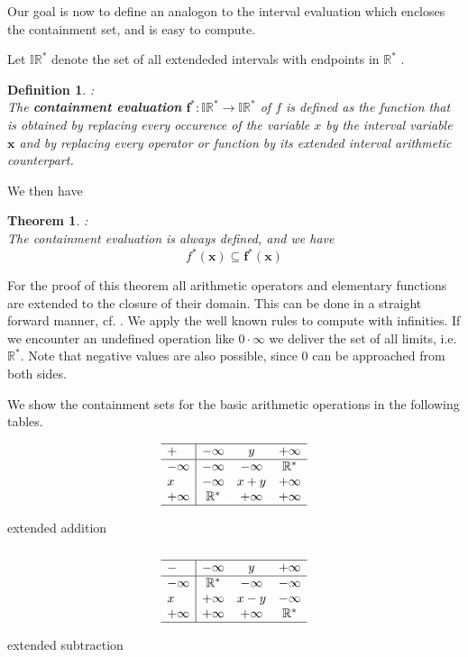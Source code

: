 \documentclass{report}
\newcommand{\Rs}{\mathbb{R}^*}
\newcommand{\IRs}{\mathbb{IR}^*}
\newcommand{\xx}{\mathbf{x}}
\newcommand{\ffs}{\mathbf{f}^*}
\newtheorem{defin}{Definition}
\newtheorem{theorem}{Theorem}
\begin{document}
Our goal is now to define an analogon to the interval evaluation which encloses
the containment set, and is easy to compute.

Let $\IRs$ denote the set of all extendeded intervals with endpoints in $\Rs$ .

\begin{defin}:\\  The \textbf{containment evaluation} $\ffs: \IRs \rightarrow \IRs$ of $f$ is defined as the
function that is obtained by replacing every occurence of the variable $x$ by
the interval variable $\xx$ and by replacing every operator  or function by its
extended interval arithmetic counterpart.
\end{defin}

We then have
\begin{theorem}:\\
The containment evaluation is always defined, and we have
\[ f^*(\xx) \subseteq \ffs(\xx) \]
\end{theorem}

For the proof of this theorem all arithmetic operators and elementary functions
are extended to the closure 
of their domain. This can be done in a straight
forward manner, cf. \cite{sun}. We apply the well known rules to compute with
infinities. If we encounter an undefined operation like $ 0 \cdot \infty$ we
deliver the set of all limits, i.e. $\Rs$. Note that negative values are also
possible, since 0 can be approached from both sides.

We show the containment sets for the basic arithmetic operations in
the following tables.


\begin{table}
\[
\begin{array}{l|ccc}
\hline
+&-\infty & y &+\infty\\
\hline
-\infty  & -\infty & -\infty &\Rs\\
x   &   -\infty  & x+y     &     +\infty\\ 
+\infty &  \Rs & +\infty & +\infty\\
\hline
\end{array}
\]
\caption{\label{add}extended addition}
\end{table}

\begin{center}
\begin{table}
\[
\begin{array}[t]{l|ccc}
\hline
-&-\infty & y &+\infty\\
\hline
-\infty  &\Rs& -\infty & -\infty \\
x   &   +\infty  & x-y     &     -\infty\\ 
+\infty & +\infty & +\infty &  \Rs\\
\hline
\end{array}
\]
\caption{\label{sub}extended subtraction}
\end{table}
\end{center}
\end{document}
